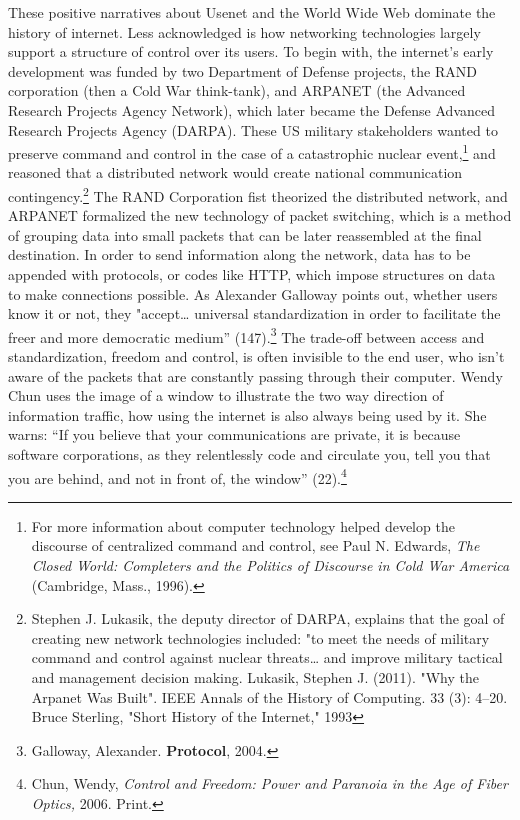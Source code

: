 \documentclass[11pt]{article}
\begin{document}
These positive narratives about Usenet and the World Wide Web dominate
the history of internet. Less acknowledged is how networking
technologies largely support a structure of control over its users. To
begin with, the internet's early development was funded by two
Department of Defense projects, the RAND corporation (then a Cold War
think-tank), and ARPANET (the Advanced Research Projects Agency
Network), which later became the Defense Advanced Research Projects
Agency (DARPA). These US military stakeholders wanted to preserve
command and control in the case of a catastrophic nuclear
event,\footnote{For more information about computer technology helped develop
the discourse of centralized command and control, see Paul N. Edwards,
\emph{The Closed World: Completers and the Politics of Discourse in Cold
War America} (Cambridge, Mass., 1996).} and reasoned that a distributed network would create
national communication contingency.\footnote{Stephen J. Lukasik, the deputy director of DARPA, explains
that the goal of creating new network technologies included: "to meet
the needs of military command and control against nuclear
threats\ldots{} and improve military tactical and management decision
making. Lukasik, Stephen J. (2011). "Why the Arpanet Was Built". IEEE
Annals of the History of Computing. 33 (3): 4–20. Bruce Sterling,
"Short History of the Internet," 1993} The RAND Corporation fist
theorized the distributed network, and ARPANET formalized the new
technology of packet switching, which is a method of grouping data
into small packets that can be later reassembled at the final
destination. In order to send information along the network, data has
to be appended with protocols, or codes like HTTP, which impose
structures on data to make connections possible.  As Alexander
Galloway points out, whether users know it or not, they
"accept\ldots{} universal standardization in order to facilitate the freer
and more democratic medium” (147).\footnote{Galloway, Alexander. \textbf{Protocol}, 2004.} The trade-off between access
and standardization, freedom and control, is often invisible to the
end user, who isn't aware of the packets that are constantly passing
through their computer. Wendy Chun uses the image of a window to
illustrate the two way direction of information traffic, how using the
internet is also always being used by it. She warns: “If you believe
that your communications are private, it is because software
corporations, as they relentlessly code and circulate you, tell you
that you are behind, and not in front of, the window” (22).\footnote{Chun, Wendy, \emph{Control and Freedom: Power and Paranoia in the
Age of Fiber Optics,} 2006. Print.}
\end{document}
